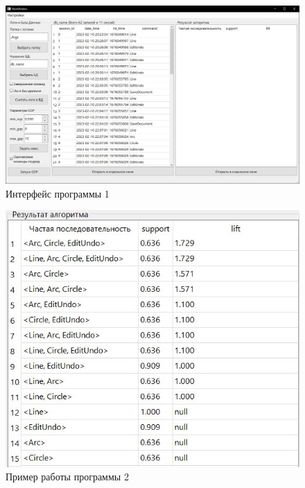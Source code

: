 \begin{figure}[h!]
	\centering
	\includegraphics[width=1\textwidth]{inc/img/interface1.jpg}
	\caption{Интерфейс программы 1}
	\label{interface1}
\end{figure}


\begin{figure}[h!] %
	\centering
	\includegraphics[width=1\textwidth]{inc/img/example1.jpg}
	\caption{Пример работы программы 2}
	\label{example1}
\end{figure}

